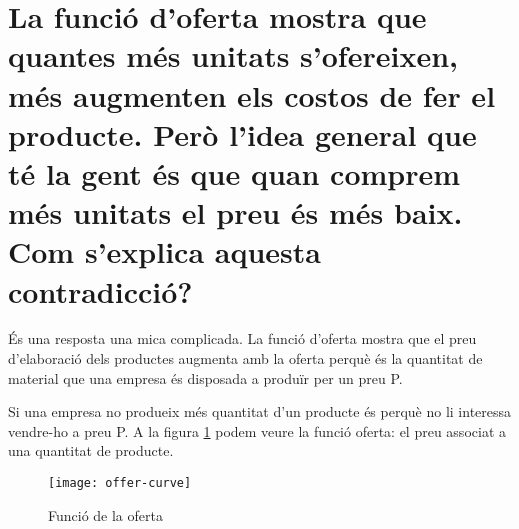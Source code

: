\section {
  La funció d’oferta mostra que quantes més unitats s’ofereixen, més
  augmenten els costos de fer el producte.
  Però l’idea general que té la gent és que
  quan comprem més unitats el preu és més baix. 
  Com s’explica aquesta contradicció?
}

És una resposta una mica complicada. La funció d'oferta mostra que el preu
d'elaboració dels productes augmenta amb la oferta perquè és la quantitat
de material que una empresa és disposada a produïr per un preu P.

Si una empresa no produeix més quantitat d'un producte és perquè no li
interessa vendre-ho a preu P. A la figura \ref{fig:offer-curve} podem
veure la funció oferta: el preu associat a una quantitat de producte.


\begin{figure}[h]
\caption{Funció de la oferta} 
\centering
\texttt{[image: offer-curve]}
\label{fig:offer-curve}
\end{figure}

